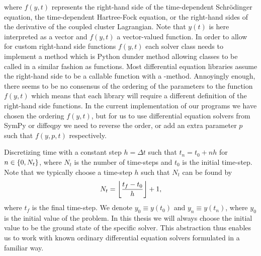             where $f(y, t)$ represents the right-hand side of the time-dependent
            Schrödinger equation, the time-dependent Hartree-Fock equation, or
            the right-hand sides of the derivative of the coupled cluster
            Lagrangian.
            Note that $y(t)$ is here interpreted as a vector and $f(y, t)$ a
            vector-valued function.
            In order to allow for custom right-hand side functions $f(y, t)$
            each solver class needs to implement a  method which
            is Python dunder method allowing classes to be called in a similar
            fashion as functions.
            Most differential equation libraries \cite{sympy} \cite{julia-diff}
            assume the right-hand side to be a callable function with a
            -method.
            Annoyingly enough, there seems to be no consensus of the ordering of
            the parameters to the function $f(y, t)$ which means that each
            library will require a different definition of the right-hand side
            functions.
            In the current implementation of our programs we have chosen the
            ordering $f(y, t)$, but for us to use differential equation solvers
            from SymPy \cite{sympy} or diffeqpy \cite{julia-diff} we need to
            reverse the order, or add an extra parameter $p$ such that $f(y, p,
            t)$ respectively.


            Discretizing time with a constant step $h = \Delta t$ such that $t_n
            = t_0 + n h$ for $n \in \left\{ 0, N_t \right\}$, where $N_t$ is the number of
            time-steps and $t_0$ is the initial time-step.
            Note that we typically choose a time-step $h$ such that $N_t$ can be
            found by
            \begin{align}
                N_t = \left\lfloor \frac{t_f - t_0}{h} \right\rfloor + 1,
            \end{align}
            where $t_f$ is the final time-step.
            We denote $y_0 \equiv y(t_0)$ and $y_n \equiv y(t_n)$, where $y_0$
            is the initial value of the problem.
            In this thesis we will always choose the initial value to be the
            ground state of the specific solver.
            This abstraction thus enables us to work with known ordinary
            differential equation solvers formulated in a familiar way.


